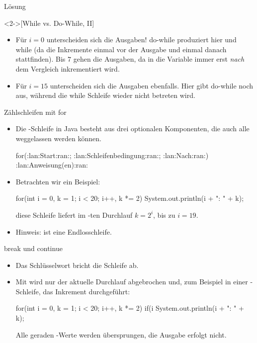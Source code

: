     \begin{frame}[c,fragile]{Lösung}
        \begin{solve}<2->[While vs. Do-While, II]
            \begin{itemize}[<+(1)->]
            \item Für \(i = 0\) unterscheiden sich die Ausgaben! do-while produziert hier  und while  (da die Inkremente einmal vor der Ausgabe und einmal danach stattfinden). Bis \(7\) gehen die Ausgaben, da in  die Variable  immer erst \emph{nach} dem Vergleich inkrementiert wird.
            \item Für \(i = 15\) unterscheiden sich die Ausgaben ebenfalls. Hier gibt do-while noch  aus, während die while Schleife wieder nicht betreten wird.
            \end{itemize}
        \end{solve}
    \end{frame}
\fi

\begin{frame}[fragile]{Zählschleifen mit for}
    \begin{itemize}[<+(1)->]
        \widei
        \item Die -Schleife in Java besteht aus drei optionalen Komponenten,\pause{} die auch alle weggelassen werden können.
        \begin{plainjava}
for(:lan:Start:ran:; :lan:Schleifenbedingung:ran:; :lan:Nach:ran:) {
    :lan:Anweisung(en):ran:
}
        \end{plainjava}
        \item Betrachten wir ein Beispiel:\pause{}
\begin{plainjava}
for(int i = 0, k = 1; i < 20; i++, k *= 2)
    System.out.println(i + ": " + k);
\end{plainjava}
    \pause{}diese Schleife liefert im -ten Durchlauf \(k = 2^i\),\pause{} bis zu \(i = 19\).
        \item Hinweis:  ist eine Endlosschleife.
    \end{itemize}
\end{frame}

\begin{frame}[fragile]{break und continue}
    \begin{itemize}[<+(1)->]
        \widei
        \item Das Schlüsselwort  bricht die  Schleife ab.
        \item Mit  wird nur der aktuelle Durchlauf abgebrochen und,\pause{} zum Beispiel in einer -Schleife,\pause{} das Inkrement durchgeführt:\pause{}
\begin{plainjava}
for(int i = 0, k = 1; i < 20; i++, k *= 2) {
    if(i %
    System.out.println(i + ": " + k);
}
\end{plainjava}
        \pause{}Alle geraden -Werte werden übersprungen, die Ausgabe erfolgt nicht.
    \end{itemize}
\end{frame}

